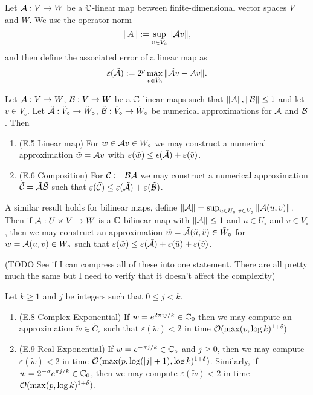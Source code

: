 Let $\mathcal A: V \to W$ be a ${\mathbb C}$-linear map between finite-dimensional vector spaces $V$ and $W$. We use the operator norm
\[
    \|A\| := \sup_{v \in V_\circ} \|\mathcal Av\|,
\]
and then define the associated error of a linear map as
\[
    \varepsilon(\tilde{\mathcal A}) := 2^p \max_{v \in \tilde{V}_0} \|\tilde{\mathcal A}v - \mathcal Av\|.
\]
\begin{proposition}
    Let $\mathcal A: V \to W$, $\mathcal B: V \to W$ be a ${\mathbb C}$-linear maps such that $\|\mathcal A\|, \|\mathcal B\| \le 1$ and let $v \in V_\circ$. Let $\tilde{\mathcal A}: \tilde{V}_\circ \to \tilde{W}_\circ$, $\tilde{\mathcal B}: \tilde{V}_\circ \to \tilde{W}_\circ$ be numerical approximations for $\mathcal A$ and $\mathcal B$. Then

    \begin{enumerate}
        \item (E.5 Linear map) For $w \in \mathcal Av \in W_\circ$ we may construct a numerical approximation $\tilde{w} = \mathcal Av$ with $\varepsilon(\tilde{w}) \le \epsilon(\tilde{\mathcal A}) + \varepsilon(\tilde{v})$.
        \item (E.6 Composition) For $\mathcal C := \mathcal B\mathcal A$ we may construct a numerical approximation $\tilde{\mathcal C} = \tilde{\mathcal A}\tilde{\mathcal B}$ such that $\varepsilon(\tilde{\mathcal C}) \le \varepsilon(\tilde{\mathcal A}) + \varepsilon(\tilde{\mathcal B})$.
    \end{enumerate}
\end{proposition}

A similar result holds for bilinear maps, define $\|\mathcal A\| = \sup_{u \in U_\circ, v \in V_\circ} \|\mathcal A(u, v)\|$.
Then if $\mathcal A: U \times V \to W$ is a ${\mathbb C}$-bilinear map with $\|\mathcal A\| \le 1$ and $u \in U_\circ$ and $v \in V_\circ$, then we may construct an approximation $\tilde{w} = \tilde{\mathcal A}(\tilde{u}, \tilde{v}) \in \tilde{W}_\circ$ for $w = \mathcal A(u, v) \in W_\circ$ such that $\varepsilon(\tilde{w}) \le \varepsilon(\tilde{\mathcal A}) + \varepsilon(\tilde{u}) + \varepsilon(\tilde{v})$.


(TODO See if I can compress all of these into one statement. There are all pretty much the same but I need to verify that it doesn't affect the complexity)

\begin{lemma}
    Let $k \ge 1$ and $j$ be integers such that $0 \le j < k$.
    \begin{enumerate}
        \item (E.8 Complex Exponential) If $w = e^{2\pi i j / k} \in {\mathbb C}_0$ then we may compute an approximation $\tilde{w} \in \tilde{C}_\circ$ such that $\varepsilon(\tilde{w}) < 2$ in time $\mathcal O(\max(p, \log k)^{1 + \delta})$
        \item (E.9 Real Exponential) If $w = e^{-\pi j / k} \in {\mathbb C}_\circ$ and $j \ge 0$, then we may compute $\varepsilon(\tilde{w}) < 2$ in time $\mathcal O(\max(p, \log (|j| + 1), \log k)^{1 + \delta})$. Similarly, if $w = 2^{- \sigma} e^{\pi j / k} \in {\mathbb C}_0$, then we may compute $\varepsilon(\tilde{w}) < 2$ in time $\mathcal O(\max(p, \log k)^{1 + \delta})$.
    \end{enumerate}
\end{lemma}


